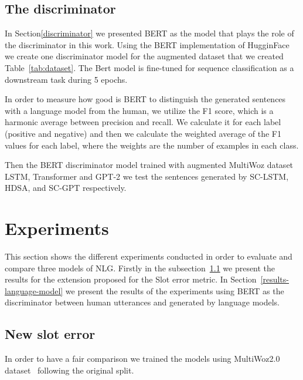 \documentclass[11pt]{article}
\begin{document}
\subsection{The discriminator}
In Section\ref{discriminator} we presented BERT as the model that plays the role of the discriminator in this work. Using the BERT implementation of HugginFace~\cite{Wolf2019HuggingFacesTS} we create one discriminator model for the augmented dataset that we created Table~\ref{tab:dataset}. The Bert model is fine-tuned for sequence classification as a downstream task during 5 epochs.

In order to measure how good is BERT to distinguish the generated sentences with a language model from the human, we utilize the F1 score, which is a harmonic average between precision and recall. We calculate it for each label (positive and negative) and then we calculate the weighted average of the F1 values for each label, where the weights are the number of examples in each class.

Then the BERT discriminator model trained with augmented MultiWoz dataset LSTM, Transformer and GPT-2 we test the sentences generated by SC-LSTM, HDSA, and SC-GPT respectively.


\section{Experiments} %
This section shows the different experiments conducted in order to evaluate and compare three models of NLG. Firstly in the subsection~\ref{results-new-slot-error} we present the results for the extension proposed for the Slot error metric. In Section~\ref{results-language-model} we present the results of the experiments using BERT as the discriminator between human utterances and generated by language models.

\subsection{New slot error}\label{results-new-slot-error}
In order to have a fair comparison we trained the models using MultiWoz2.0 dataset~\cite{budzianowski-etal-2018-multiwoz} following the original split. 
\end{document}

